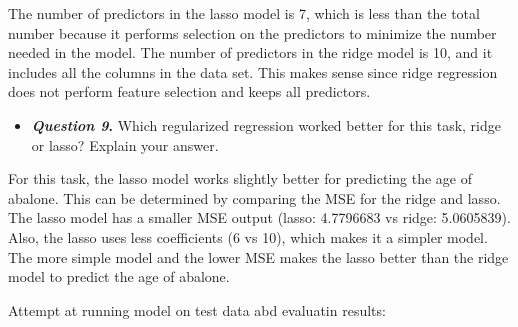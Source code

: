 \documentclass[
]{article}
\providecommand{\tightlist}{%
  \setlength{\itemsep}{0pt}\setlength{\parskip}{0pt}}
\begin{document}
The number of predictors in the lasso model is 7, which is less than the
total number because it performs selection on the predictors to minimize
the number needed in the model. The number of predictors in the ridge
model is 10, and it includes all the columns in the data set. This makes
sense since ridge regression does not perform feature selection and
keeps all predictors.

\begin{itemize}
\tightlist
\item
  \textbf{\emph{Question 9}.} Which regularized regression worked better
  for this task, ridge or lasso? Explain your answer.
\end{itemize}

For this task, the lasso model works slightly better for predicting the
age of abalone. This can be determined by comparing the MSE for the
ridge and lasso. The lasso model has a smaller MSE output (lasso:
4.7796683 vs ridge: 5.0605839). Also, the lasso uses less coefficients
(6 vs 10), which makes it a simpler model. The more simple model and the
lower MSE makes the lasso better than the ridge model to predict the age
of abalone.

Attempt at running model on test data abd evaluatin results:
\end{document}

